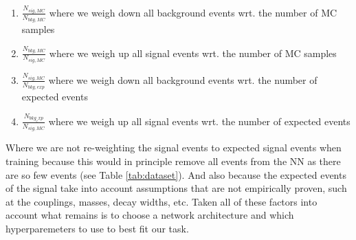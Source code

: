 \documentclass[14pt, a4paper]{book}
\begin{document}
\begin{enumerate}
   \item $\frac{N_{sig,MC}}{N_{bkg,MC}}$ where we weigh down all background events wrt. the number of MC samples
   \item $\frac{N_{bkg,MC}}{N_{sig,MC}}$ where we weigh up all signal events wrt. the number of MC samples
   \item $\frac{N_{sig,MC}}{N_{bkg,exp}}$ where we weigh down all background events wrt. the number of expected events
   \item $\frac{N_{bkg_exp}}{N_{sig,MC}}$ where we weigh up all signal events wrt. the number of expected events
\end{enumerate}
Where we are not re-weighting the signal events to expected signal events when training because this would in principle remove all events from the NN as there are so few events (see Table \ref{tab:dataset}). And also because the expected events of the signal take into account assumptions that are not empirically proven, 
such at the couplings, masses, decay widths, etc. Taken all of these factors into account what remains is to choose a network architecture and which hyperparemeters to use to best fit our task.


\clearpage
\end{document}
